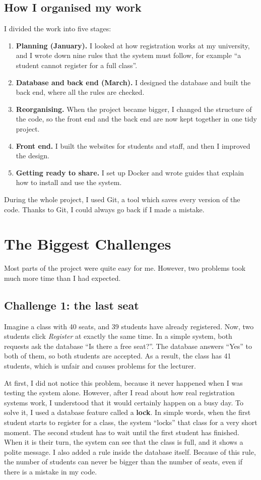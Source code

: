 \documentclass[12pt,a4paper]{article}
\begin{document}
\subsection{How I organised my work}
I divided the work into five stages:
\begin{enumerate}[leftmargin=1.6em]
  \item \textbf{Planning (January).} I looked at how registration works at my
        university, and I wrote down nine rules that the system must follow,
        for example ``a student cannot register for a full class''.
  \item \textbf{Database and back end (March).} I designed the database and
        built the back end, where all the rules are checked.
  \item \textbf{Reorganising.} When the project became bigger, I changed the
        structure of the code, so the front end and the back end are now kept
        together in one tidy project.
  \item \textbf{Front end.} I built the websites for students and staff, and
        then I improved the design.
  \item \textbf{Getting ready to share.} I set up Docker and wrote guides
        that explain how to install and use the system.
\end{enumerate}
During the whole project, I used Git, a tool which saves every version of the
code. Thanks to Git, I could always go back if I made a mistake.

\section{The Biggest Challenges}

Most parts of the project were quite easy for me. However, two problems took
much more time than I had expected.

\subsection{Challenge 1: the last seat}
Imagine a class with 40 seats, and 39 students have already registered. Now,
two students click \emph{Register} at exactly the same time. In a simple
system, both requests ask the database ``Is there a free seat?''. The database
answers ``Yes'' to both of them, so both students are accepted. As a result,
the class has 41 students, which is unfair and causes problems for the
lecturer.

At first, I did not notice this problem, because it never happened when I was
testing the system alone. However, after I read about how real registration
systems work, I understood that it would certainly happen on a busy day. To
solve it, I used a database feature called a \textbf{lock}. In simple words,
when the first student starts to register for a class, the system ``locks''
that class for a very short moment. The second student has to wait until the
first student has finished. When it is their turn, the system can see that the
class is full, and it shows a polite message. I also added a rule inside the
database itself. Because of this rule, the number of students can never be
bigger than the number of seats, even if there is a mistake in my code.
\end{document}
